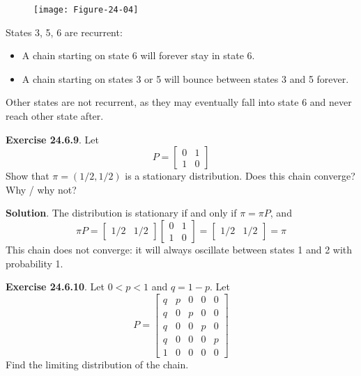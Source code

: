 \begin{figure}[H]
\centering
\texttt{[image: Figure-24-04]}
\end{figure}

States 3, 5, 6 are recurrent:
\begin{itemize}[tightlist]
\item
  A chain starting on state 6 will forever stay in state 6.
\item
  A chain starting on states 3 or 5 will bounce between states 3 and 5
  forever.
\end{itemize}
Other states are not recurrent, as they may eventually fall into state 6
and never reach other state after.

\textbf{Exercise 24.6.9}. Let
\[
P = \begin{bmatrix}
0 & 1 \\
1 & 0
\end{bmatrix}
\]
Show that \(\pi = (1/2, 1/2)\) is a stationary distribution. Does this
chain converge? Why / why not?

\textbf{Solution}. The distribution is stationary if and only if
\(\pi = \pi P\), and
\[
\pi P = \begin{bmatrix} 1/2 & 1/2 \end{bmatrix}
\begin{bmatrix} 0 & 1 \\ 1 & 0 \end{bmatrix}
= \begin{bmatrix} 1/2 & 1/2 \end{bmatrix} = \pi
\]
This chain does not converge: it will always oscillate between states 1
and 2 with probability 1.

\textbf{Exercise 24.6.10}. Let \(0 < p < 1\) and \(q = 1 - p\). Let
\[
P = 
\begin{bmatrix}
q & p & 0 & 0 & 0 \\
q & 0 & p & 0 & 0 \\
q & 0 & 0 & p & 0 \\
q & 0 & 0 & 0 & p \\
1 & 0 & 0 & 0 & 0
\end{bmatrix}
\]
Find the limiting distribution of the chain.

